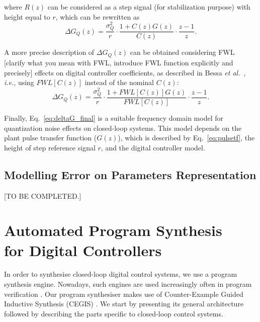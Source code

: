 \documentclass{sig-alternate-05-2015}
\newcommand{\red}[1]{{\color{red}#1}}
\begin{document}
\noindent where $R(z)$ can be considered as a step signal (for stabilization
purpose) with height equal to $r$, which can be rewritten as
%
\begin{equation}
\Delta{G_{Q}(z)}=\frac{\sigma^{2}_{Q}}{r}\cdot \frac{1+C(z)G(z)}{C(z)} \cdot \frac{z-1}{z}.
\end{equation}

A more precise description of $\Delta{G_{Q}(z)}$ can be obtained
considering FWL \red{[clarify what you mean with FWL, introduce FWL function explicitly and precisely]} effects on digital controller coefficients, as described in
Bessa {\it et al.}~\cite{Bessa16}, {\it i.e.}, using $FWL[C(z)]$ instead of
the nominal $C(z)$:
%
\begin{equation}
\label{eq:deltaG_final}
\Delta{G_{Q}(z)}=\frac{\sigma^{2}_{Q}}{r}\cdot \frac{1+FWL[C(z)]G(z)}{FWL[C(z)]} \cdot \frac{z-1}{z}.
\end{equation}

Finally, Eq.~\eqref{eq:deltaG_final} is a suitable frequency domain model
for quantization noise effects on closed-loop systems.  This model depends
on the plant pulse transfer function ($G(z)$), which is described by
Eq.~\eqref{eq:pulsetf}, the height of step reference signal $r$, and the
digital controller model.

\subsection{Modelling Error on Parameters Representation} 

\red{[TO BE COMPLETED.]}


\section{Automated Program Synthesis \\ for Digital Controllers}


In order to synthesise closed-loop digital control systems, we use a
program synthesis engine.  Nowadays, such engines are used
increasingly often in program verification
\cite{DBLP:conf/lpar/DavidKL15,DBLP:conf/cav/0001A14}.  Our program
synthesiser makes use of Counter-Example Guided Inductive Synthesis
(CEGIS) \cite{sketch}.  We start by presenting its general
architecture followed by describing the parts specific to closed-loop control
systems.
\end{document}
